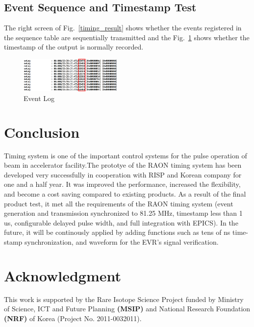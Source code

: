 \documentclass[journal,reqno]{IEEEtran}
\begin{document}
\subsection{Event Sequence and Timestamp Test}
The right screen of Fig.~\ref{timing_result} shows whether the events registered in the sequence table are sequentially transmitted and the Fig.~\ref*{event_log} shows whether the timestamp of the output is normally recorded.

\begin{figure}[!htb]
	\centering
	\includegraphics*[width=0.45\textwidth, height=0.13\textwidth]{img23.png}
	\caption{Event Log}
	\label{event_log}
\end{figure}

\section{Conclusion}
Timing system is one of the important control systems for the pulse operation of beam in accelerator facility.The prototye of the RAON timing system has been developed very successfully in cooperation with RISP and Korean company for one and a half year. It was improved the performance, increased the flexibility, and become a cost saving compared to existing products. As a result of the final product test, it met all the requirements of the RAON timing system (event generation and transmission synchronized to 81.25 MHz, timestamp less than 1 us,  configurable delayed pulse width, and full integration with EPICS). In the future, it will be continously applied by adding functions such as tens of ns time-stamp synchronization, and waveform for the EVR's signal verification.

\section*{Acknowledgment}
This work is supported by the Rare Isotope Science Project funded by Ministry of Science, ICT and Future Planning \textbf{(MSIP)} and National Research Foundation \textbf{(NRF)} of Korea (Project No. 2011-0032011).


\end{document}
